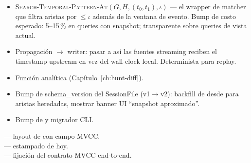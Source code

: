 \begin{itemize}
    \item \textsc{Search-Temporal-Pattern-At}$(G, H, (t_0, t_1),
        \iota)$ --- el wrapper de matcher que filtra aristas por
         $\leq \iota$ además de la ventana
        de evento. Bump de costo esperado: 5--15\,\% en queries
        con snapshot; transparente sobre queries de vista
        actual.
    \item Propagación  $\to$ writer: pasar
         a 
        así las fuentes streaming reciben el timestamp upstream
        en vez del wall-clock local. Determinista para replay.
    \item Función analítica 
        (Capítulo~\ref{ch:hunt-diff}).
    \item Bump de schema\_version del SessionFile (v1$\to$v2):
        backfill de  desde 
        para aristas heredadas, mostrar banner UI ``snapshot
        aproximado''.
    \item Bump de  y migrador CLI.
\end{itemize}

\begin{inthecode}
 --- layout de
\Compact{} con campo MVCC.\\
 --- estampado de
 hoy.\\
 ---
fijación del contrato MVCC end-to-end.
\end{inthecode}
